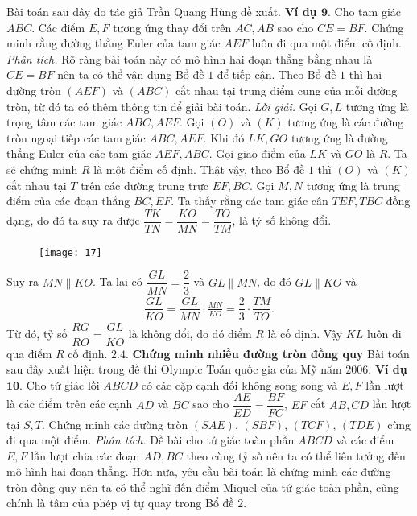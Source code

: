 \begin{multicols}{2}
	\vskip 0.1cm
	Bài toán sau đây do tác giả Trần Quang Hùng đề xuất.
	\vskip 0.1cm
	\textbf{\color{diendantoanhoc}Ví dụ $\pmb{9.}$} Cho tam giác $ABC$. Các điểm $E,F$ tương ứng thay đổi trên $AC,AB$ sao cho $CE=BF$. Chứng minh rằng đường thẳng Euler của tam giác $AEF$ luôn đi qua một điểm cố định.
	\vskip 0.1cm
	\textit{Phân tích.} Rõ ràng bài toán này có mô hình hai đoạn thẳng bằng nhau là $CE=BF$ nên ta có thể vận dụng Bổ đề $1$ để tiếp cận. Theo Bổ đề $1$ thì hai đường tròn $(AEF)$ và $(ABC)$ cắt nhau tại trung điểm cung của mỗi đường tròn, từ đó ta có thêm thông tin để giải bài toán.
	\vskip 0.1cm
	\textit{Lời giải.} Gọi $ G,L$ tương ứng là trọng tâm các tam giác $ABC,AEF$. Gọi $(O)$ và $(K)$ tương ứng là các đường tròn ngoại tiếp các tam giác $ABC, AEF$. Khi đó $LK,GO$ tương ứng là đường thẳng Euler của các tam giác $AEF,ABC$. Gọi giao điểm của $LK$ và $ GO$ là $R$. Ta sẽ chứng minh $R$ là một điểm cố định. Thật vậy, theo Bổ đề $1$ thì $(O)$ và $(K)$ cắt nhau tại $T$ trên các đường trung trực $EF,BC$. Gọi $ M,N$ tương ứng là trung điểm của các đoạn thẳng $BC,EF$. Ta thấy rằng các tam giác cân $TEF,TBC$ đồng dạng, do đó ta suy ra được $\dfrac{TK}{TN} = \dfrac{KO}{MN} = \dfrac{TO}{TM}$, là tỷ số không đổi.
	\begin{figure}[H]
		\vspace*{-5pt}
		\centering
		\captionsetup{labelformat= empty, justification=centering}
		\texttt{[image: 17]}
		\vspace*{-10pt}
	\end{figure}
	Suy ra $MN\parallel KO$. Ta lại có $\dfrac{GL}{MN} = \dfrac{2}{3}$  và $GL\parallel MN$, do đó $GL\parallel KO$ và
	\begin{align*}
		\dfrac{GL}{KO} = \dfrac{GL}{MN}\cdot \frac{MN}{KO} = \dfrac{2}{3} \cdot \dfrac{TM}{TO}.
	\end{align*}
	Từ đó, tỷ số $\dfrac{RG}{RO} = \dfrac{GL}{KO}$ là không đổi, do đó điểm $R$ là cố định. Vậy $KL$ luôn đi qua điểm $R$ cố định.
	\vskip 0.1cm
	$\pmb{2.4.}$ \textbf{\color{diendantoanhoc}Chứng minh nhiều đường tròn đồng quy}
	\vskip 0.1cm
	Bài toán sau đây xuất hiện trong đề thi Olympic Toán quốc gia của Mỹ năm $2006$.
	\vskip 0.1cm
	\textbf{\color{diendantoanhoc}Ví dụ $\pmb{10.}$}  Cho tứ giác lồi $ABCD$ có các cặp cạnh đối không song song và $E,F$ lần lượt là các điểm trên các cạnh $AD$ và $BC$ sao cho  $\dfrac{AE}{ED} = \dfrac{BF}{FC}$, $EF$ cắt $AB,CD$ lần lượt tại $S,T$. Chứng minh các đường tròn $(SAE)$, $(SBF)$, $(TCF)$, $(TDE)$ cùng đi qua một điểm.
	\vskip 0.1cm
	\textit{Phân tích.} Đề bài cho tứ giác toàn phần $ABCD$ và các điểm $E,F$ lần lượt chia các đoạn $AD,BC$ theo cùng tỷ số nên ta có thể liên tưởng đến mô hình hai đoạn thẳng. Hơn nữa, yêu cầu bài toán là chứng minh các đường tròn đồng quy nên ta có thể nghĩ đến điểm Miquel của tứ giác toàn phần, cũng chính là tâm của phép vị tự quay trong Bổ đề $2$.

\end{multicols}
